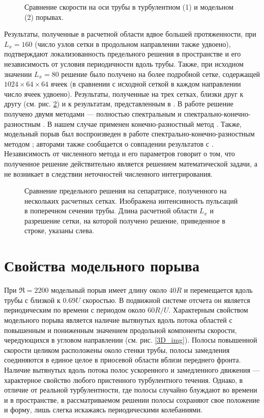 \begin{figure}
\caption{Сравнение скорости на оси трубы в турбулентном (1) и модельном (2) порывах.}
\label{ucl_cmp_img}
\end{figure}

Результаты, полученные в расчетной области вдвое большей протяженности, при $L_x = 160$ (число узлов сетки в продольном направлении также удвоено), подтверждают локализованность предельного решения в пространстве и его независимость от условия периодичности вдоль трубы. Также, при исходном значении $L_x = 80$ решение было получено на более подробной сетке, содержащей $1024 \times 64 \times 64$ ячеек (в сравнении с исходной сеткой в каждом направлении число ячеек удвоено).  Результаты, полученные на трех сетках, близки друг к другу (см. рис. \ref{mesh_conv_pic}) и к результатам, представленным в \cite{Avila2013}. В работе \cite{Avila2013} решение получено двумя методами --- полностью спектральным \cite{Meseguer2007} и спектрально-конечно-разностным \cite{Willis2009}. В нашем случае применен конечно-разностный метод \cite{Nikitin2006}. Также, модельный порыв был воспроизведен в работе \cite{Chantry2014} спектрально-конечно-разностным методом \cite{Willis2009}; авторами также сообщается о совпадении результатов с \cite{Avila2013}. Независимость от численного метода и его параметров говорит о том, что полученное решение действительно является решением математической задачи, а не возникает в следствии неточностей численного интегрирования. 

\begin{figure}[h]
\caption{Сравнение предельного решения на сепаратрисе, полученного на нескольких расчетных сетках. Изображена интенсивность пульсаций в поперечном сечении трубы. Длина расчетной области $L_x$ и разрешение сетки, на которой получено решение, приведенное в строке, указаны слева. }
\label{mesh_conv_pic}
\end{figure}


\section{Свойства модельного порыва}

При $\Re=2200$ модельный порыв имеет длину около $40R$ и перемещается вдоль трубы с близкой к $0.69U$ скоростью. В подвижной системе отсчета он является периодическим по времени с периодом около $60 R/U$. Характерным свойством модельного порыва является наличие вытянутых вдоль потока областей с повышенным и пониженным значением продольной компоненты скорости, чередующихся в угловом направлении (см. рис. \ref{3D_img}). Полосы повышенной скорости целиком расположены около стенки трубы, полосы замедления соединяются в единое целое в приосевой области вблизи переднего фронта. Наличие вытянутых вдоль потока полос ускоренного и замедленного движения --- характерное свойство любого пристенного турбулентного течения. Однако, в отличие от реальной турбулентности, где полосы случайно блуждают во времени и в пространстве, в рассматриваемом решении полосы сохраняют свое положение и форму, лишь слегка искажаясь периодическими колебаниями. 

